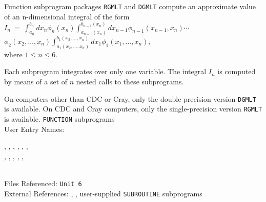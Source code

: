                                 
                          
\Submitter{}                                     
                        
Function subprogram packages {\tt RGMLT} and {\tt DGMLT}
compute an approximate value of an n-dimensional integral of the form
\\[4mm]
\hspace*{35mm} $ I_n \ = \ \displaystyle
\int_{a_n}^{b_n} dx_n \phi_n(x_n)
\displaystyle \int_{a_{n-1}(x_n)}^{b_{n-1}(x_n)}
dx_{n-1} \phi_{n-1}(x_{n-1},x_n) \cdots$ \\[4mm]
\hspace*{55mm} $\phi_2(x_2,\ldots,x_n)
\displaystyle \int_{a_1(x_2,\ldots,x_n)}^{b_1(x_2,\ldots,x_n)}
dx_1 \phi_1(x_1,\ldots,x_n),$ \\[4mm]
where $1 \leq n \leq 6$.
\par
Each subprogram integrates over only one variable. The integral $I_n$
is computed by means of a set of $n$ nested calls to these subprograms.
\par
On computers other than CDC or Cray, only
the double-precision version {\tt DGMLT} is available.
On CDC and  Cray computers, only the single-precision version
{\tt RGMLT} is available.
\Structure
{\tt FUNCTION} subprograms\\
User Entry Names: \parbox[t]{.6\textwidth}{%
, , , ,
, ,  \\
, , , ,
, } \\[1mm]
Files Referenced: {\tt Unit 6} \\
External References: , ,
user-supplied {\tt SUBROUTINE} subprograms
\Usage

